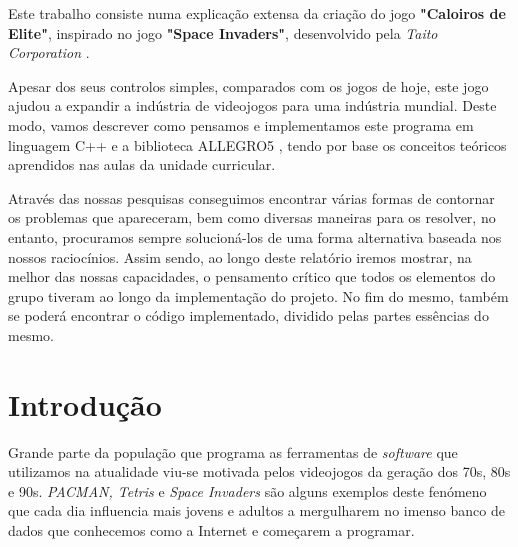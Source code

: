 \documentclass[a4paper,11pt]{article}
\newcommand\tab[1][0.8cm]{\hspace*{#1}}
\begin{document}
\tab Este trabalho consiste numa explicação extensa da criação do jogo \textbf{"Caloiros de Elite"}, inspirado no jogo \textbf{"Space Invaders"}, desenvolvido pela \textit{Taito Corporation} \cite{spaceInv}.

\vspace{8pt}

Apesar dos seus controlos simples,
comparados com os jogos de hoje, este jogo ajudou a expandir a indústria de videojogos para
uma indústria mundial. Deste modo, vamos descrever como pensamos e implementamos este programa em linguagem C++ \cite{c++} e a biblioteca ALLEGRO5 \cite{allegro}, tendo por base os conceitos teóricos aprendidos nas aulas da unidade curricular.

\vspace{8pt}

Através das nossas pesquisas conseguimos encontrar várias formas de contornar os problemas que apareceram, bem como diversas maneiras para os resolver, no entanto, procuramos sempre solucioná-los de uma forma alternativa baseada nos nossos raciocínios. Assim sendo, ao longo deste relatório iremos mostrar, na melhor das nossas capacidades, o pensamento crítico que todos os elementos do grupo tiveram ao longo da implementação do projeto. No fim do mesmo, também se poderá encontrar o código implementado, dividido pelas partes essências do mesmo.

\vspace{40pt}


\pagebreak

\pagebreak


\renewcommand{\contentsname}{Índice}        %
\tableofcontents
{}

\vspace{40pt}
\listoffigures

\pagebreak


\setcounter{secnumdepth}{3}


\section{Introdução}\label{Intro}

\setcounter{page}{1}
\tab

\vspace{8pt}

Grande parte da população que programa as ferramentas de \textit{software} que utilizamos na atualidade viu-se motivada pelos videojogos da geração dos 70s, 80s e 90s. \textit{PACMAN, Tetris} e \textit{Space Invaders} são alguns exemplos deste fenómeno que cada dia influencia mais jovens e adultos a mergulharem no imenso banco de dados que conhecemos como a Internet e começarem a programar.
\end{document}
